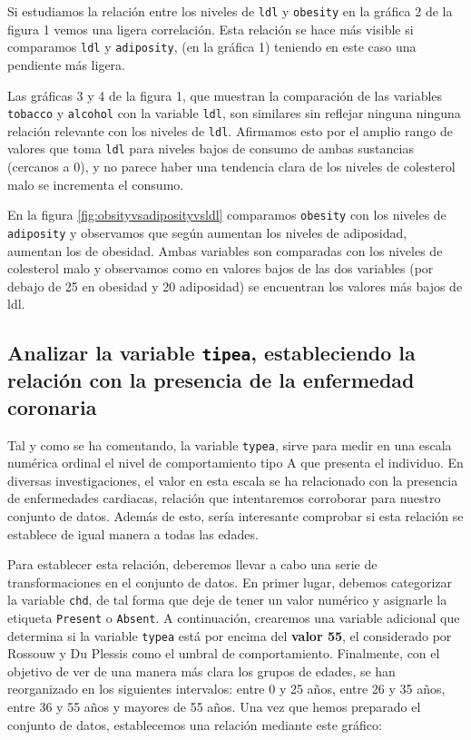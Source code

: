\documentclass[a4paper, 9pt]{article}
\begin{document}
Si estudiamos la relación entre los niveles de \texttt{ldl} y \texttt{obesity} en la gráfica 2 de la figura 1 vemos una ligera correlación. Esta relación se hace más visible si comparamos \texttt{ldl} y \texttt{adiposity}, (en la gráfica 1) teniendo en este caso una pendiente más ligera.


Las gráficas 3 y 4 de la figura 1, que muestran la comparación de las variables \texttt{tobacco} y \texttt{alcohol} con la variable \texttt{ldl}, son  similares sin reflejar ninguna ninguna relación relevante con los niveles de \texttt{ldl}. Afirmamos esto por el amplio rango de valores que toma \texttt{ldl} para niveles bajos de consumo de ambas sustancias (cercanos a 0), y no parece haber una tendencia clara de los niveles de colesterol malo se incrementa el consumo. 

\vspace{3mm}

En la figura \ref{fig:obsityvsadiposityvsldl} comparamos \texttt{obesity} con los niveles de \texttt{adiposity} y observamos que según aumentan los niveles de adiposidad, aumentan los de obesidad. Ambas variables son comparadas con los niveles de colesterol malo y observamos como en valores bajos de las dos variables (por debajo de 25 en obesidad y 20 adiposidad) se encuentran los valores más bajos de ldl.

\vspace{3mm}

\setcounter{figure}{0}
\setcounter{table}{0}

\subsection{Analizar la variable \texttt{tipea}, estableciendo la relación con la presencia de la enfermedad coronaria}

Tal y como se ha comentando, la variable \texttt{typea}, sirve para medir en una escala numérica ordinal el nivel de comportamiento tipo A que presenta el individuo. En diversas investigaciones, el valor en esta escala se ha relacionado con la presencia de enfermedades cardiacas, relación que intentaremos corroborar para nuestro conjunto de datos. Además de esto, sería interesante comprobar si esta relación se establece de igual manera a todas las edades.

\vspace{3mm}

Para establecer esta relación, deberemos llevar a cabo una serie de transformaciones en el conjunto de datos. En primer lugar, debemos categorizar la variable \texttt{chd}, de tal forma que deje de tener un valor numérico y asignarle la etiqueta \texttt{Present} o \texttt{Absent}. A continuación, crearemos una variable adicional que determina si la variable \texttt{typea} está por encima del \textbf{valor 55}, el considerado por Rossouw y Du Plessis como el umbral de comportamiento. Finalmente, con el objetivo de ver de una manera más clara los grupos de edades, se han reorganizado en los siguientes intervalos: entre 0 y 25 años, entre 26 y 35 años, entre 36 y 55 años y mayores de 55 años. Una vez que hemos preparado el conjunto de datos, establecemos una relación mediante este gráfico:
\end{document}
